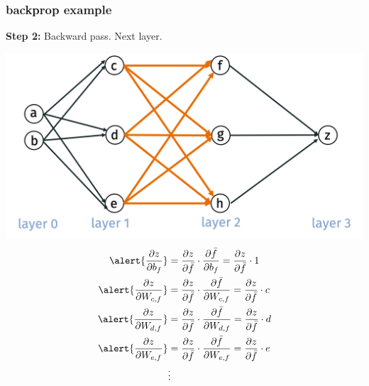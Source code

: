 \documentclass[handout,compress]{beamer}
\begin{document}
	\begin{frame}[t]
	\frametitle{backprop example}
	\small
	\textbf{Step 2:} Backward pass. Next layer.
	
	\includegraphics[width=.5\textwidth]{layer2.png}
	\begin{align*}
	\alert{\frac{\partial z}{\partial b_{f}}} &= \frac{\partial z}{\partial \bar{f}}\cdot \frac{\partial \bar{f}}{\partial b_f} = \frac{\partial z}{\partial \bar{f}} \cdot 1\\
	\alert{\frac{\partial z}{\partial W_{c,f}}} &= \frac{\partial z}{\partial \bar{f}}\cdot \frac{\partial \bar{f}}{\partial W_{c,f}} = \frac{\partial z}{\partial \bar{f}}\cdot c\\
		\alert{\frac{\partial z}{\partial W_{d,f}}} &= \frac{\partial z}{\partial \bar{f}}\cdot \frac{\partial \bar{f}}{\partial W_{d,f}} = \frac{\partial z}{\partial \bar{f}}\cdot d\\
			\alert{\frac{\partial z}{\partial W_{e,f}}} &= \frac{\partial z}{\partial \bar{f}}\cdot \frac{\partial \bar{f}}{\partial W_{e,f}} = \frac{\partial z}{\partial \bar{f}}\cdot e\\
		&\vdots
	\end{align*}
\end{frame}
\end{document}
